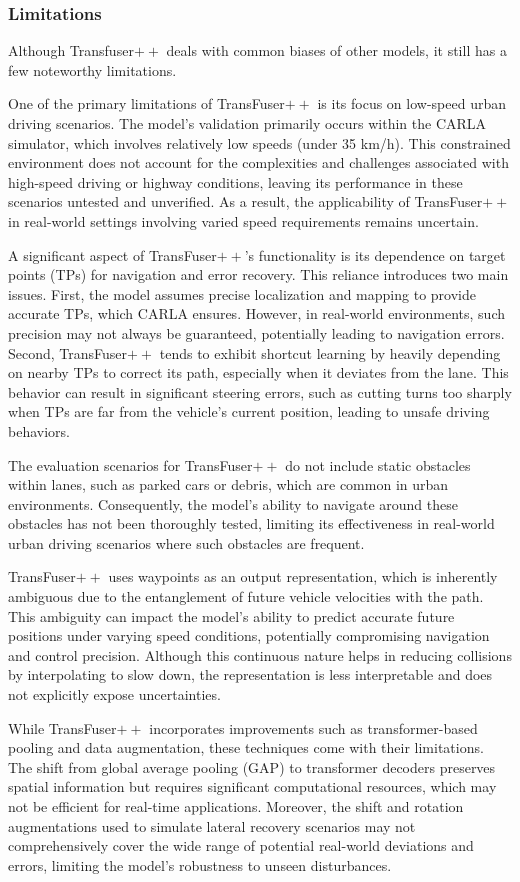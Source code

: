 \subsubsection*{Limitations}

Although Transfuser$++$ deals with common biases of other models, it still has a few noteworthy limitations.

One of the primary limitations of TransFuser$++$ is its focus on low-speed urban driving scenarios. The model's validation primarily occurs within the CARLA simulator, which involves relatively low speeds (under 35 km/h). This constrained environment does not account for the complexities and challenges associated with high-speed driving or highway conditions, leaving its performance in these scenarios untested and unverified. As a result, the applicability of TransFuser$++$ in real-world settings involving varied speed requirements remains uncertain.

A significant aspect of TransFuser$++$'s functionality is its dependence on target points (TPs) for navigation and error recovery. This reliance introduces two main issues. First, the model assumes precise localization and mapping to provide accurate TPs, which CARLA ensures. However, in real-world environments, such precision may not always be guaranteed, potentially leading to navigation errors. Second, TransFuser$++$ tends to exhibit shortcut learning by heavily depending on nearby TPs to correct its path, especially when it deviates from the lane. This behavior can result in significant steering errors, such as cutting turns too sharply when TPs are far from the vehicle's current position, leading to unsafe driving behaviors.

The evaluation scenarios for TransFuser$++$ do not include static obstacles within lanes, such as parked cars or debris, which are common in urban environments. Consequently, the model's ability to navigate around these obstacles has not been thoroughly tested, limiting its effectiveness in real-world urban driving scenarios where such obstacles are frequent.

TransFuser$++$ uses waypoints as an output representation, which is inherently ambiguous due to the entanglement of future vehicle velocities with the path. This ambiguity can impact the model's ability to predict accurate future positions under varying speed conditions, potentially compromising navigation and control precision. Although this continuous nature helps in reducing collisions by interpolating to slow down, the representation is less interpretable and does not explicitly expose uncertainties.

While TransFuser$++$ incorporates improvements such as transformer-based pooling and data augmentation, these techniques come with their limitations. The shift from global average pooling (GAP) to transformer decoders preserves spatial information but requires significant computational resources, which may not be efficient for real-time applications. Moreover, the shift and rotation augmentations used to simulate lateral recovery scenarios may not comprehensively cover the wide range of potential real-world deviations and errors, limiting the model's robustness to unseen disturbances.